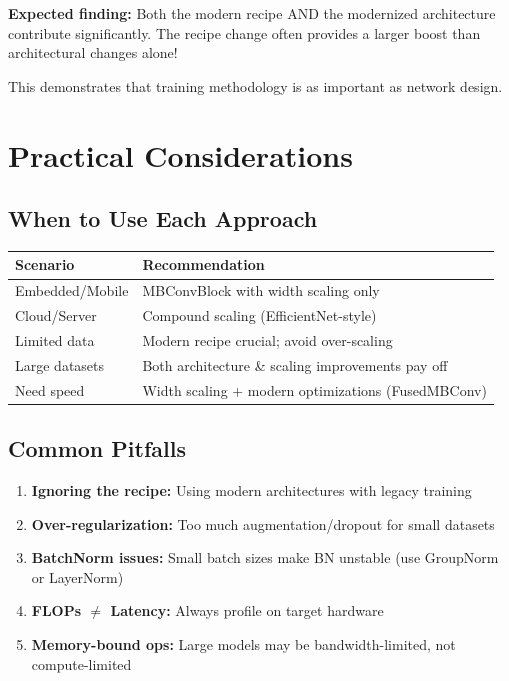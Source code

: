 \documentclass{article}
\begin{document}
\begin{tcolorbox}[colback=green!5!white, colframe=green!75!black, title=Key Insight from Experiment 2]
\textbf{Expected finding:} Both the modern recipe AND the modernized architecture contribute significantly. The recipe change often provides a larger boost than architectural changes alone!

This demonstrates that training methodology is as important as network design.
\end{tcolorbox}

\section{Practical Considerations}

\subsection{When to Use Each Approach}

\begin{table}[h]
\centering
\begin{tabular}{|l|p{8cm}|}
\hline
\textbf{Scenario} & \textbf{Recommendation} \\
\hline
Embedded/Mobile & MBConvBlock with width scaling only \\
Cloud/Server & Compound scaling (EfficientNet-style) \\
Limited data & Modern recipe crucial; avoid over-scaling \\
Large datasets & Both architecture \& scaling improvements pay off \\
Need speed & Width scaling + modern optimizations (FusedMBConv) \\
\hline
\end{tabular}
\end{table}

\subsection{Common Pitfalls}

\begin{enumerate}
    \item \textbf{Ignoring the recipe:} Using modern architectures with legacy training
    \item \textbf{Over-regularization:} Too much augmentation/dropout for small datasets
    \item \textbf{BatchNorm issues:} Small batch sizes make BN unstable (use GroupNorm or LayerNorm)
    \item \textbf{FLOPs $\neq$ Latency:} Always profile on target hardware
    \item \textbf{Memory-bound ops:} Large models may be bandwidth-limited, not compute-limited
\end{enumerate}
\end{document}
